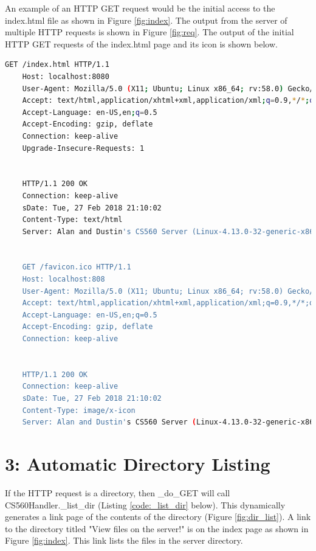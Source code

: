\documentclass{article}
\begin{document}
	


	An example of an HTTP GET request would be the initial access to the index.html file as shown in Figure \ref{fig:index}. The output from the server of multiple HTTP requests is shown in Figure \ref{fig:req}. The output of the initial HTTP GET requests of the index.html page and its icon is shown below.
	
	\begin{lstlisting}[language=bash, style=bash]
	GET /index.html HTTP/1.1
	Host: localhost:8080
	User-Agent: Mozilla/5.0 (X11; Ubuntu; Linux x86_64; rv:58.0) Gecko/20100101 Firefox/58.0
	Accept: text/html,application/xhtml+xml,application/xml;q=0.9,*/*;q=0.8
	Accept-Language: en-US,en;q=0.5
	Accept-Encoding: gzip, deflate
	Connection: keep-alive
	Upgrade-Insecure-Requests: 1


	HTTP/1.1 200 OK
	Connection: keep-alive
	sDate: Tue, 27 Feb 2018 21:10:02
	Content-Type: text/html
	Server: Alan and Dustin's CS560 Server (Linux-4.13.0-32-generic-x86_64-with-Ubuntu-16.04-xenial)


	GET /favicon.ico HTTP/1.1
	Host: localhost:808
	User-Agent: Mozilla/5.0 (X11; Ubuntu; Linux x86_64; rv:58.0) Gecko/20100101 Firefox/58.0
	Accept: text/html,application/xhtml+xml,application/xml;q=0.9,*/*;q=0.8
	Accept-Language: en-US,en;q=0.5
	Accept-Encoding: gzip, deflate
	Connection: keep-alive


	HTTP/1.1 200 OK
	Connection: keep-alive
	sDate: Tue, 27 Feb 2018 21:10:02
	Content-Type: image/x-icon
	Server: Alan and Dustin's CS560 Server (Linux-4.13.0-32-generic-x86_64-with-Ubuntu-16.04-xenial)
	\end{lstlisting}

\section*{3: Automatic Directory Listing}
	If the HTTP request is a directory, then \_do\_GET will call CS560Handler.\_list\_dir (Listing \ref{code:_list_dir} below). This dynamically generates a link page of the contents of the directory (Figure \ref{fig:dir_list}). A link to the directory titled "View files on the server!" is on the index page as shown in Figure \ref{fig:index}. This link lists the files in the server directory.
	
	
	
\end{document}
